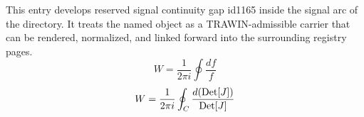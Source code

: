 
\begin{tzpsnapshot}
\end{tzpsnapshot}

This entry develops reserved signal continuity gap id1165 inside the signal arc of the directory. It treats the named object as a TRAWIN-admissible carrier that can be rendered, normalized, and linked forward into the surrounding registry pages.
\[
W = \frac{1}{2\pi i} \oint \frac{df}{f}
\]
\[
W = \frac{1}{2\pi i} \oint_C \frac{d({\rm Det}[J])}{{\rm Det}[J]}
\]

